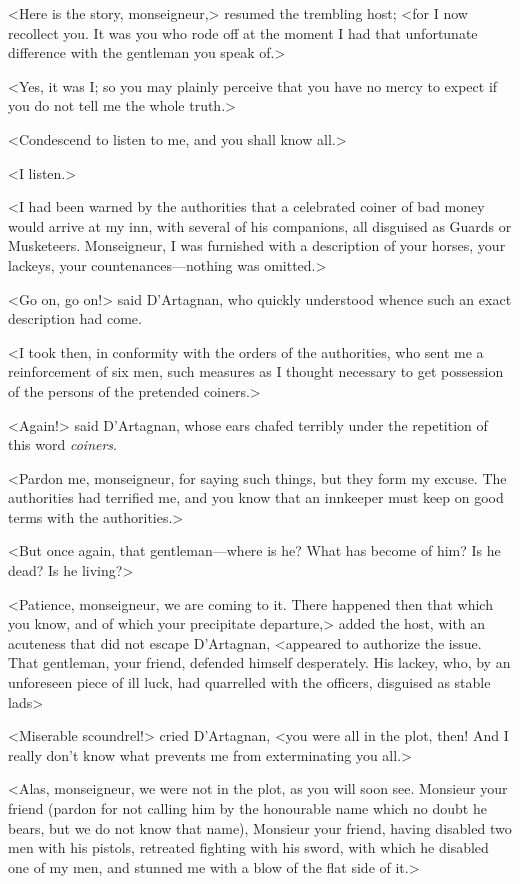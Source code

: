 <Here is the story, monseigneur,> resumed the trembling host; <for I now recollect you. It was you who rode off at the moment I had that unfortunate difference with the gentleman you speak of.> 

<Yes, it was I; so you may plainly perceive that you have no mercy to expect if you do not tell me the whole truth.> 

<Condescend to listen to me, and you shall know all.> 

<I listen.> 

<I had been warned by the authorities that a celebrated coiner of bad money would arrive at my inn, with several of his companions, all disguised as Guards or Musketeers. Monseigneur, I was furnished with a description of your horses, your lackeys, your countenances—nothing was omitted.> 

<Go on, go on!> said D'Artagnan, who quickly understood whence such an exact description had come. 

<I took then, in conformity with the orders of the authorities, who sent me a reinforcement of six men, such measures as I thought necessary to get possession of the persons of the pretended coiners.> 

<Again!> said D'Artagnan, whose ears chafed terribly under the repetition of this word \emph{coiners}. 

<Pardon me, monseigneur, for saying such things, but they form my excuse. The authorities had terrified me, and you know that an innkeeper must keep on good terms with the authorities.> 

<But once again, that gentleman—where is he? What has become of him? Is he dead? Is he living?> 

<Patience, monseigneur, we are coming to it. There happened then that which you know, and of which your precipitate departure,> added the host, with an acuteness that did not escape D'Artagnan, <appeared to authorize the issue. That gentleman, your friend, defended himself desperately. His lackey, who, by an unforeseen piece of ill luck, had quarrelled with the officers, disguised as stable lads\longdash> 

<Miserable scoundrel!> cried D'Artagnan, <you were all in the plot, then! And I really don't know what prevents me from exterminating you all.> 

<Alas, monseigneur, we were not in the plot, as you will soon see. Monsieur your friend (pardon for not calling him by the honourable name which no doubt he bears, but we do not know that name), Monsieur your friend, having disabled two men with his pistols, retreated fighting with his sword, with which he disabled one of my men, and stunned me with a blow of the flat side of it.> 

